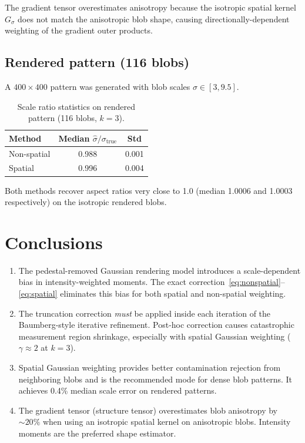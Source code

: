 \documentclass[11pt]{article}
\begin{document}
The gradient tensor overestimates anisotropy because the isotropic spatial
kernel $G_\sigma$ does not match the anisotropic blob shape, causing
directionally-dependent weighting of the gradient outer products.

\subsection{Rendered pattern (116 blobs)}

A $400\times400$ pattern was generated with blob scales $\sigma \in [3, 9.5]$.

\begin{table}[h]
\centering
\caption{Scale ratio statistics on rendered pattern (116 blobs, $k=3$).}
\label{tab:pattern}
\begin{tabular}{@{}lcc@{}}
\toprule
Method & Median $\hat\sigma/\sigma_\text{true}$ & Std \\
\midrule
Non-spatial & 0.988 & 0.001 \\
Spatial     & 0.996 & 0.004 \\
\bottomrule
\end{tabular}
\end{table}

Both methods recover aspect ratios very close to 1.0 (median 1.0006 and
1.0003 respectively) on the isotropic rendered blobs.

\section{Conclusions}

\begin{enumerate}
  \item The pedestal-removed Gaussian rendering model introduces a
        scale-dependent bias in intensity-weighted moments. The exact
        correction~\eqref{eq:nonspatial}--\eqref{eq:spatial} eliminates this
        bias for both spatial and non-spatial weighting.

  \item The truncation correction \emph{must} be applied inside each iteration
        of the Baumberg-style iterative refinement. Post-hoc correction causes
        catastrophic measurement region shrinkage, especially with spatial
        Gaussian weighting ($\gamma \approx 2$ at $k=3$).

  \item Spatial Gaussian weighting provides better contamination rejection from
        neighboring blobs and is the recommended mode for dense blob patterns.
        It achieves 0.4\% median scale error on rendered patterns.

  \item The gradient tensor (structure tensor) overestimates blob anisotropy by
        ${\sim}20\%$ when using an isotropic spatial kernel on anisotropic blobs.
        Intensity moments are the preferred shape estimator.
\end{enumerate}
\end{document}
